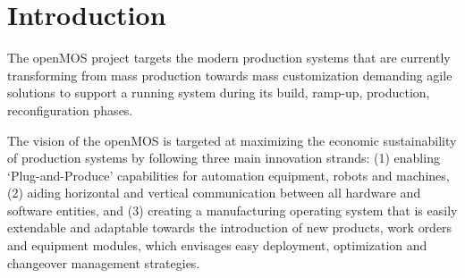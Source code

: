 \section{Introduction}

The \gls{openMOS} project targets the modern production systems that are currently transforming from mass production towards mass customization demanding agile solutions to support a running system during its build, ramp-up, production, reconfiguration phases.

The vision of the \gls{openMOS} is targeted at maximizing the economic sustainability of production systems by following three main innovation strands: (1) enabling ‘Plug-and-Produce’ capabilities for automation equipment, robots and machines, (2) aiding horizontal and vertical communication between all hardware and software entities, and (3) creating a manufacturing operating system that is easily extendable and adaptable towards the introduction of new products, work orders and equipment modules, which envisages easy deployment, optimization and changeover management strategies. 